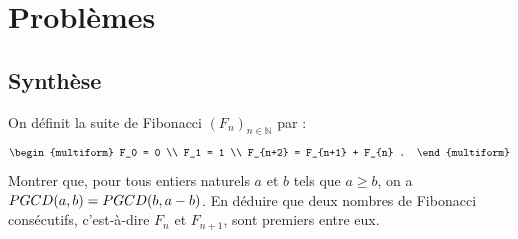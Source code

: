 \chapter{Problèmes}
\section{Synthèse}
\begin{exo}
	On d\'efinit la suite de Fibonacci $(F_n)_{n\in\mathbb{N}}$ par :
	\[
		\begin{multiform}
			F_0 = 0 \\
			F_1 = 1 \\
			F_{n+2} = F_{n+1} + F_{n} .
		\end{multiform}
	\]
	Montrer que, pour tous entiers naturels $a$ et $b$ tels que $a \geq b$, on a
	$PGCD(a,b) = PGCD(b,a-b)$.
	En d\'eduire que deux nombres de Fibonacci cons\'ecutifs, c'est-\`a-dire
	$F_n$ et $F_{n+1}$, sont premiers entre eux.
\end{exo}

